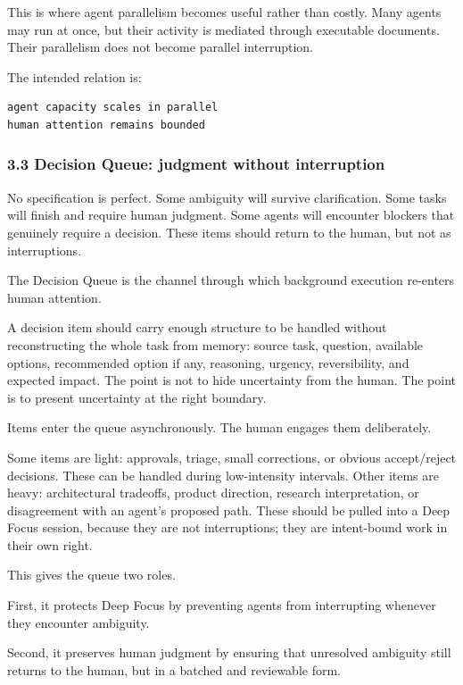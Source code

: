 \documentclass[
  nonatbib,
  preprint]{article}
\begin{document}
This is where agent parallelism becomes useful rather than costly. Many
agents may run at once, but their activity is mediated through
executable documents. Their parallelism does not become parallel
interruption.

The intended relation is:

\begin{verbatim}
agent capacity scales in parallel
human attention remains bounded
\end{verbatim}

\subsubsection{\texorpdfstring{\textbf{3.3 Decision Queue: judgment
without
interruption}}{3.3 Decision Queue: judgment without interruption}}\label{decision-queue-judgment-without-interruption}

No specification is perfect. Some ambiguity will survive clarification.
Some tasks will finish and require human judgment. Some agents will
encounter blockers that genuinely require a decision. These items should
return to the human, but not as interruptions.

The Decision Queue is the channel through which background execution
re-enters human attention.

A decision item should carry enough structure to be handled without
reconstructing the whole task from memory: source task, question,
available options, recommended option if any, reasoning, urgency,
reversibility, and expected impact. The point is not to hide uncertainty
from the human. The point is to present uncertainty at the right
boundary.

Items enter the queue asynchronously. The human engages them
deliberately.

Some items are light: approvals, triage, small corrections, or obvious
accept/reject decisions. These can be handled during low-intensity
intervals. Other items are heavy: architectural tradeoffs, product
direction, research interpretation, or disagreement with an agent's
proposed path. These should be pulled into a Deep Focus session, because
they are not interruptions; they are intent-bound work in their own
right.

This gives the queue two roles.

First, it protects Deep Focus by preventing agents from interrupting
whenever they encounter ambiguity.

Second, it preserves human judgment by ensuring that unresolved
ambiguity still returns to the human, but in a batched and reviewable
form.
\end{document}
